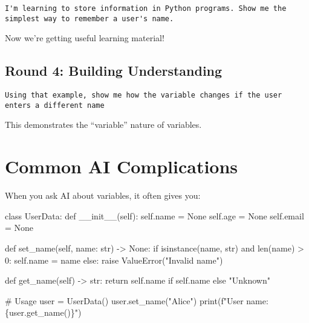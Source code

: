 \documentclass[
  letterpaper,
  DIV=11,
  numbers=noendperiod,
  oneside]{scrreprt}
\newenvironment{Shaded}{}{}
\newcommand{\BuiltInTok}[1]{\textcolor[rgb]{0.84,0.23,0.29}{#1}}
\newcommand{\CommentTok}[1]{\textcolor[rgb]{0.42,0.45,0.49}{#1}}
\newcommand{\ControlFlowTok}[1]{\textcolor[rgb]{0.84,0.23,0.29}{#1}}
\newcommand{\DecValTok}[1]{\textcolor[rgb]{0.00,0.36,0.77}{#1}}
\newcommand{\FunctionTok}[1]{\textcolor[rgb]{0.44,0.26,0.76}{#1}}
\newcommand{\KeywordTok}[1]{\textcolor[rgb]{0.84,0.23,0.29}{#1}}
\newcommand{\NormalTok}[1]{\textcolor[rgb]{0.14,0.16,0.18}{#1}}
\newcommand{\OperatorTok}[1]{\textcolor[rgb]{0.14,0.16,0.18}{#1}}
\newcommand{\PreprocessorTok}[1]{\textcolor[rgb]{0.84,0.23,0.29}{#1}}
\newcommand{\SpecialCharTok}[1]{\textcolor[rgb]{0.00,0.36,0.77}{#1}}
\newcommand{\SpecialStringTok}[1]{\textcolor[rgb]{0.01,0.18,0.38}{#1}}
\newcommand{\StringTok}[1]{\textcolor[rgb]{0.01,0.18,0.38}{#1}}
\newcommand{\VariableTok}[1]{\textcolor[rgb]{0.89,0.38,0.04}{#1}}
\begin{document}
\begin{verbatim}
I'm learning to store information in Python programs. Show me the simplest way to remember a user's name.
\end{verbatim}

Now we're getting useful learning material!

\subsection{Round 4: Building
Understanding}\label{round-4-building-understanding}

\begin{verbatim}
Using that example, show me how the variable changes if the user enters a different name
\end{verbatim}

This demonstrates the ``variable'' nature of variables.

\section{Common AI Complications}\label{common-ai-complications-1}

When you ask AI about variables, it often gives you:

\begin{Shaded}
\begin{Highlighting}[]
\KeywordTok{class}\NormalTok{ UserData:}
    \KeywordTok{def} \FunctionTok{\_\_init\_\_}\NormalTok{(}\VariableTok{self}\NormalTok{):}
        \VariableTok{self}\NormalTok{.name }\OperatorTok{=} \VariableTok{None}
        \VariableTok{self}\NormalTok{.age }\OperatorTok{=} \VariableTok{None}
        \VariableTok{self}\NormalTok{.email }\OperatorTok{=} \VariableTok{None}
    
    \KeywordTok{def}\NormalTok{ set\_name(}\VariableTok{self}\NormalTok{, name: }\BuiltInTok{str}\NormalTok{) }\OperatorTok{{-}\textgreater{}} \VariableTok{None}\NormalTok{:}
        \ControlFlowTok{if} \BuiltInTok{isinstance}\NormalTok{(name, }\BuiltInTok{str}\NormalTok{) }\KeywordTok{and} \BuiltInTok{len}\NormalTok{(name) }\OperatorTok{\textgreater{}} \DecValTok{0}\NormalTok{:}
            \VariableTok{self}\NormalTok{.name }\OperatorTok{=}\NormalTok{ name}
        \ControlFlowTok{else}\NormalTok{:}
            \ControlFlowTok{raise} \PreprocessorTok{ValueError}\NormalTok{(}\StringTok{"Invalid name"}\NormalTok{)}
    
    \KeywordTok{def}\NormalTok{ get\_name(}\VariableTok{self}\NormalTok{) }\OperatorTok{{-}\textgreater{}} \BuiltInTok{str}\NormalTok{:}
        \ControlFlowTok{return} \VariableTok{self}\NormalTok{.name }\ControlFlowTok{if} \VariableTok{self}\NormalTok{.name }\ControlFlowTok{else} \StringTok{"Unknown"}

\CommentTok{\# Usage}
\NormalTok{user }\OperatorTok{=}\NormalTok{ UserData()}
\NormalTok{user.set\_name(}\StringTok{"Alice"}\NormalTok{)}
\BuiltInTok{print}\NormalTok{(}\SpecialStringTok{f"User name: }\SpecialCharTok{\{}\NormalTok{user}\SpecialCharTok{.}\NormalTok{get\_name()}\SpecialCharTok{\}}\SpecialStringTok{"}\NormalTok{)}
\end{Highlighting}
\end{Shaded}
\end{document}
